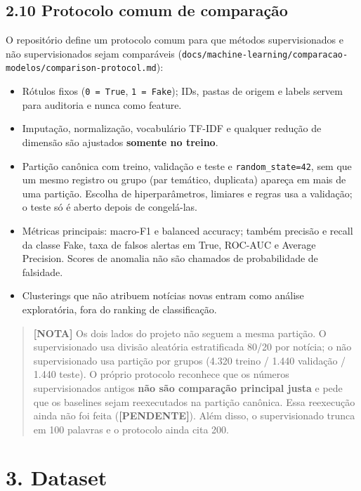 \documentclass[
  brazilian,
  11pt,
]{article}
\providecommand{\tightlist}{%
  \setlength{\itemsep}{0pt}\setlength{\parskip}{0pt}}
\begin{document}
\subsection{2.10 Protocolo comum de comparação}\label{protocolo-comum-de-comparauxe7uxe3o}

O repositório define um protocolo comum para que métodos supervisionados e não supervisionados sejam comparáveis (\texttt{docs/machine-learning/comparacao-modelos/comparison-protocol.md}):

\begin{itemize}
\tightlist
\item
  Rótulos fixos (\texttt{0\ =\ True}, \texttt{1\ =\ Fake}); IDs, pastas de origem e labels servem para auditoria e nunca como feature.
\item
  Imputação, normalização, vocabulário TF-IDF e qualquer redução de dimensão são ajustados \textbf{somente no treino}.
\item
  Partição canônica com treino, validação e teste e \texttt{random\_state=42}, sem que um mesmo registro ou grupo (par temático, duplicata) apareça em mais de uma partição. Escolha de hiperparâmetros, limiares e regras usa a validação; o teste só é aberto depois de congelá-las.
\item
  Métricas principais: macro-F1 e balanced accuracy; também precisão e recall da classe Fake, taxa de falsos alertas em True, ROC-AUC e Average Precision. Scores de anomalia não são chamados de probabilidade de falsidade.
\item
  Clusterings que não atribuem notícias novas entram como análise exploratória, fora do ranking de classificação.
\end{itemize}

\begin{quote}
\textbf{{[}NOTA{]}} Os dois lados do projeto não seguem a mesma partição. O supervisionado usa divisão aleatória estratificada 80/20 por notícia; o não supervisionado usa partição por grupos (4.320 treino / 1.440 validação / 1.440 teste). O próprio protocolo reconhece que os números supervisionados antigos \textbf{não são comparação principal justa} e pede que os baselines sejam reexecutados na partição canônica. Essa reexecução ainda não foi feita (\textbf{{[}PENDENTE{]}}). Além disso, o supervisionado trunca em 100 palavras e o protocolo ainda cita 200.
\end{quote}

\section{3. Dataset}\label{dataset}
\end{document}
